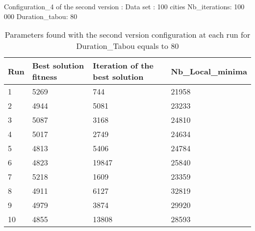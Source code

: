 \documentclass[12pt,oneside,a4paper]{article}
\begin{document}
  \newpage
  Configuration\_4 of the second version : 
\newline
Data set : 100 cities 
\newline
Nb\_iterations: 100 000 
\newline
Duration\_tabou: 80
\begin{table}[h]
    \centering
    \small
    \begin{tabular}{llll}
      \hline
      \multicolumn{1}{|l|}{\textbf{Run}}& \multicolumn{1}{l|}{\textbf{Best solution fitness}}& \multicolumn{1}{l|}{\textbf{Iteration of the best solution}}& \multicolumn{1}{l|}{\textbf{Nb\_Local\_minima}}\\ \hline
      \multicolumn{1}{|l|}{1} & \multicolumn{1}{l|}{5269}  & \multicolumn{1}{l|}{744} & \multicolumn{1}{l|}{21958}  \\ \hline
      \multicolumn{1}{|l|}{2} & \multicolumn{1}{l|}{4944}  & \multicolumn{1}{l|}{5081} & \multicolumn{1}{l|}{23233}  \\ \hline         
      \multicolumn{1}{|l|}{3} & \multicolumn{1}{l|}{5087}  & \multicolumn{1}{l|}{3168}  & \multicolumn{1}{l|}{24810}  \\ \hline
      \multicolumn{1}{|l|}{4} & \multicolumn{1}{l|}{5017}  & \multicolumn{1}{l|}{2749}  & \multicolumn{1}{l|}{24634}  \\ \hline
      \multicolumn{1}{|l|}{5} & \multicolumn{1}{l|}{4813}  & \multicolumn{1}{l|}{5406}  & \multicolumn{1}{l|}{24784}  \\ \hline
      \multicolumn{1}{|l|}{6} & \multicolumn{1}{l|}{4823}  & \multicolumn{1}{l|}{19847}  & \multicolumn{1}{l|}{25840}  \\ \hline
      \multicolumn{1}{|l|}{7} & \multicolumn{1}{l|}{5218}  & \multicolumn{1}{l|}{1609}  & \multicolumn{1}{l|}{23359 }  \\ \hline
      \multicolumn{1}{|l|}{8} & \multicolumn{1}{l|}{4911}  & \multicolumn{1}{l|}{6127} & \multicolumn{1}{l|}{32819}  \\ \hline
      \multicolumn{1}{|l|}{9} & \multicolumn{1}{l|}{4979}  & \multicolumn{1}{l|}{3874} & \multicolumn{1}{l|}{29920}  \\ \hline
      \multicolumn{1}{|l|}{10} & \multicolumn{1}{l|}{4855}  & \multicolumn{1}{l|}{13808} & \multicolumn{1}{l|}{28593}  \\ \hline
    \end{tabular}
    \caption{Parameters found with the second version configuration at each run for Duration\_Tabou equals to 80}
  \end{table}
\end{document}
